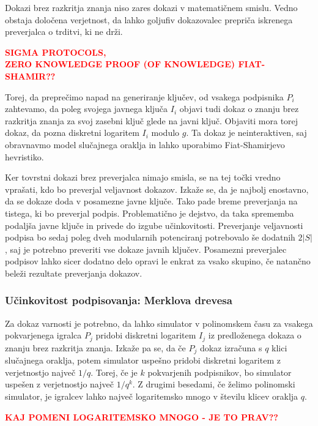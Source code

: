 \documentclass[isrm2, tisk]{fmfdelo}
\newcommand{\todo}[1]{\textcolor{red}{\textbf{\uppercase{#1}??}}}
\begin{document}
\begin{opomba}
    Dokazi brez razkritja znanja niso zares dokazi v matematičnem smislu. Vedno obstaja določena verjetnost, 
    da lahko goljufiv dokazovalec prepriča iskrenega preverjalca o trditvi, ki ne drži.
\end{opomba}

\todo{sigma protocols, \\ zero knowledge proof (of knowledge) fiat-shamir}

Torej, da preprečimo napad na generiranje ključev, od vsakega podpisnika $P_i$ zahtevamo, da poleg 
svojega javnega ključa $I_i$ objavi tudi dokaz o znanju brez razkritja znanja za svoj zasebni ključ 
glede na javni ključ. Objaviti mora torej dokaz, da pozna diskretni logaritem $I_i$ modulo $g$. 
Ta dokaz je neinteraktiven, saj obravnavmo model slučajnega oraklja in lahko uporabimo Fiat-Shamirjevo 
hevristiko.

Ker tovrstni dokazi brez preverjalca nimajo smisla, se na tej točki vredno vprašati, kdo bo preverjal 
veljavnost dokazov. Izkaže se, da je najbolj enostavno, da se dokaze doda v posamezne javne ključe. 
Tako pade breme preverjanja na tistega, ki bo preverjal podpis. Problematično je dejstvo, da taka 
sprememba podaljša javne ključe in privede do izgube učinkovitosti. Preverjanje veljavnosti podpisa 
bo sedaj poleg dveh modularnih potenciranj potrebovalo še dodatnih $2|S|$, saj je potrebno preveriti 
vse dokaze javnih ključev. Posamezni preverjalec podpisov lahko sicer dodatno delo opravi le enkrat 
za vsako skupino, če natančno beleži rezultate preverjanja dokazov.

\subsubsection{Učinkovitost podpisovanja: Merklova drevesa}
Za dokaz varnosti je potrebno, da lahko simulator v polinomskem času za vsakega pokvarjenega igralca $P_j$
pridobi diskretni logaritem $I_j$ iz predloženega dokaza o znanju brez razkritja znanja. Izkaže pa se, 
da če $P_j$ dokaz izračuna s $q$ klici slučajnega oraklja, potem simulator uspešno pridobi diskretni 
logaritem z verjetnostjo največ $1/q$. Torej, če je $k$ pokvarjenih podpisnikov, bo simulator 
uspešen z verjetnostjo največ $1/q^k$. Z drugimi besedami, če želimo polinomski simulator, je 
igralcev lahko največ logaritemsko mnogo v številu klicev oraklja $q$.

\todo{kaj pomeni logaritemsko mnogo - je to prav}
\end{document}
